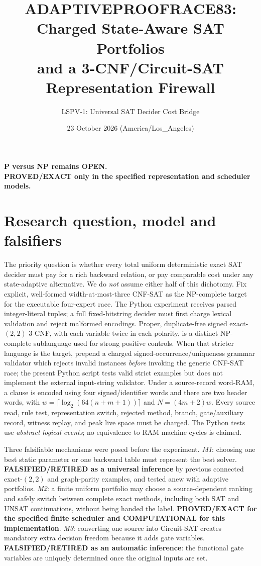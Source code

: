 \documentclass[11pt]{article}
\title{ADAPTIVEPROOFRACE83: Charged State-Aware SAT Portfolios\\
and a 3-CNF/Circuit-SAT Representation Firewall}
\author{LSPV-1: Universal SAT Decider Cost Bridge}
\date{23 October 2026 (America/Los\_Angeles)}
\begin{document}
\maketitle
\begin{center}
\textbf{P versus NP remains OPEN.}\\
\textbf{PROVED/EXACT only in the specified representation and scheduler models.}
\end{center}

\section{Research question, model and falsifiers}
The priority question is whether every total uniform deterministic exact SAT decider must pay for a rich backward relation, or pay comparable cost under any state-adaptive alternative. We do \emph{not} assume either half of this dichotomy. Fix explicit, well-formed width-at-most-three CNF-SAT as the NP-complete target for the executable four-expert race. The Python experiment receives parsed integer-literal tuples; a full fixed-bitstring decider must first charge lexical validation and reject malformed encodings. Proper, duplicate-free signed exact-$(2,2)$ 3-CNF, with each variable twice in each polarity, is a distinct NP-complete sublanguage used for strong positive controls. When that stricter language is the target, prepend a charged signed-occurrence/uniqueness grammar validator which rejects invalid instances \emph{before} invoking the generic CNF-SAT race; the present Python script tests valid strict examples but does not implement the external input-string validator. Under a source-record word-RAM, a clause is encoded using four signed/identifier words and there are two header words, with $w=\lceil\log_2(64(n+m+1))\rceil$ and $N=(4m+2)w$. Every source read, rule test, representation switch, rejected method, branch, gate/auxiliary record, witness replay, and peak live space must be charged. The Python tests use \emph{abstract logical events}; no equivalence to RAM machine cycles is claimed.

Three falsifiable mechanisms were posed before the experiment. \emph{M1}: choosing one best static parameter or one backward table must represent the best solver. \textbf{FALSIFIED/RETIRED as a universal inference} by previous connected exact-$(2,2)$ and graph-parity examples, and tested anew with adaptive portfolios. \emph{M2}: a finite uniform portfolio may choose a source-dependent ranking and safely switch between complete exact methods, including both SAT and UNSAT continuations, without being handed the label. \textbf{PROVED/EXACT for the specified finite scheduler and COMPUTATIONAL for this implementation}. \emph{M3}: converting one source into Circuit-SAT creates mandatory extra decision freedom because it adds gate variables. \textbf{FALSIFIED/RETIRED as an automatic inference}: the functional gate variables are uniquely determined once the original inputs are set.
\end{document}
